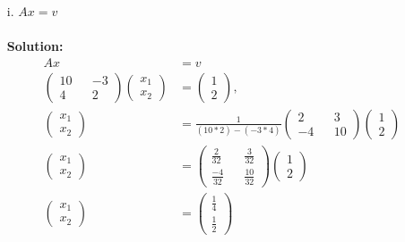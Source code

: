\documentclass[12pt]{article}
\makeatletter
\theoremstyle{homework}
\newenvironment{exercise}[1]
{\def\@currentlabel{#1}\exercisecore}
{\endexercisecore}
\makeatother
\begin{document}
\begin{exercise}{2}
\begin{enumerate}
  \item[i.] $Ax = v$\\\\
  \textbf{Solution:}       
  \begin{align*}
    Ax &= v\\
    \begin{pmatrix}
      10 && -3 \\
      4 && 2 
    \end{pmatrix} 
    \begin{pmatrix}
      x_1 \\
      x_2 
    \end{pmatrix}
    &=
    \begin{pmatrix}
      1 \\
      2 
    \end{pmatrix},\\
    \begin{pmatrix}
      x_1 \\
      x_2 
    \end{pmatrix}
    &=
    \frac{1}{(10*2)-(-3*4)}
    \begin{pmatrix}
      2 && 3 \\
      -4 && 10 
    \end{pmatrix}
    \begin{pmatrix}
      1 \\
      2 
    \end{pmatrix}\\
    \begin{pmatrix}
      x_1 \\
      x_2 
    \end{pmatrix}
    &=
    \begin{pmatrix}
      \frac{2}{32} && \frac{3}{32} \\
      \frac{-4}{32} && \frac{10}{32} 
    \end{pmatrix}
    \begin{pmatrix}
      1 \\
      2 
    \end{pmatrix}\\
    \begin{pmatrix}
      x_1 \\
      x_2 
    \end{pmatrix}
    &=
    \begin{pmatrix}
      \frac{1}{4} \\
      \frac{1}{2} 
    \end{pmatrix}
  \end{align*} 


\end{enumerate}
\end{exercise}
\vspace{1in}
\end{document}
